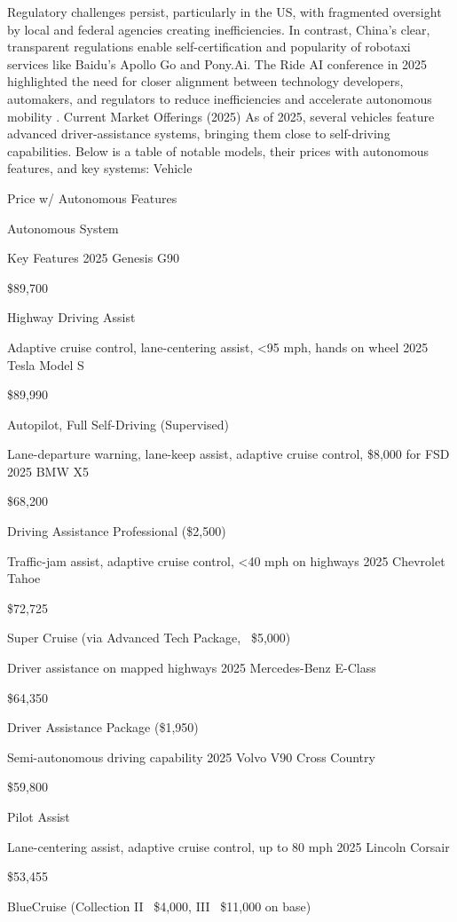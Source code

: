 Regulatory challenges persist, particularly in the US, with fragmented oversight by local and federal agencies creating inefficiencies. In contrast, China’s clear, transparent regulations enable self-certification and popularity of robotaxi services like Baidu’s Apollo Go and Pony.Ai. The Ride AI conference in 2025 highlighted the need for closer alignment between technology developers, automakers, and regulators to reduce inefficiencies and accelerate autonomous mobility .
Current Market Offerings (2025)
As of 2025, several vehicles feature advanced driver-assistance systems, bringing them close to self-driving capabilities. Below is a table of notable models, their prices with autonomous features, and key systems:
Vehicle
	
Price w/ Autonomous Features
	
Autonomous System
	
Key Features
2025 Genesis G90
	
\$89,700
	
Highway Driving Assist
	
Adaptive cruise control, lane-centering assist, <95 mph, hands on wheel
2025 Tesla Model S
	
\$89,990
	
Autopilot, Full Self-Driving (Supervised)
	
Lane-departure warning, lane-keep assist, adaptive cruise control, \$8,000 for FSD
2025 BMW X5
	
\$68,200
	
Driving Assistance Professional (\$2,500)
	
Traffic-jam assist, adaptive cruise control, <40 mph on highways
2025 Chevrolet Tahoe
	
\$72,725
	
Super Cruise (via Advanced Tech Package, ~\$5,000)
	
Driver assistance on mapped highways
2025 Mercedes-Benz E-Class
	
\$64,350
	
Driver Assistance Package (\$1,950)
	
Semi-autonomous driving capability
2025 Volvo V90 Cross Country
	
\$59,800
	
Pilot Assist
	
Lane-centering assist, adaptive cruise control, up to 80 mph
2025 Lincoln Corsair
	
\$53,455
	
BlueCruise (Collection II ~\$4,000, III ~\$11,000 on base)
	
